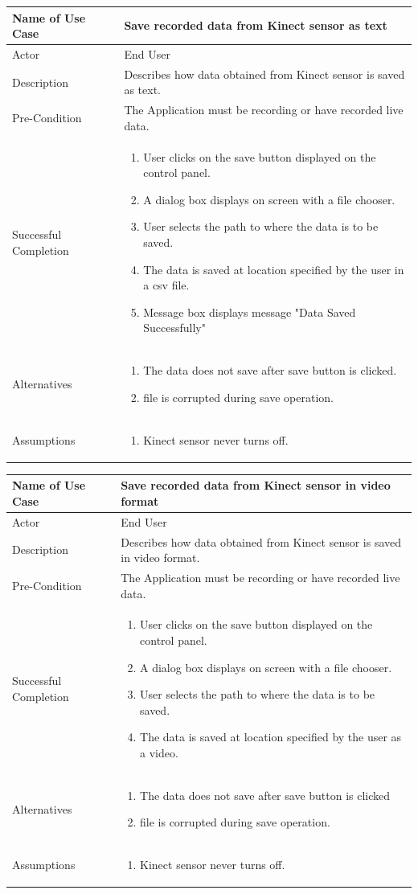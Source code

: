 \documentclass[a4paper, 12pt]{article}
\newcommand\addrow[2]{#1 &#2\\ }
\newcommand\addheading[2]{#1 &#2\\ \hline}
\newcommand\tabularhead{\begin{tabular}{lp{8cm}}
\hline
}
\newcommand\addmulrow[2]{ \begin{minipage}[t][][t]{2.5cm}#1\end{minipage}%
   &\begin{minipage}[t][][t]{8cm}
    \begin{enumerate} #2   \end{enumerate}
    \end{minipage}\\ }
\newenvironment{usecase}{\tabularhead}
{\hline\end{tabular}}
\begin{document}
\begin{usecase}
	\addheading{Name of Use Case}{Save recorded data from Kinect sensor as text }
	\addrow{Actor}{End User}
	\addrow{Description}{Describes how data obtained from Kinect sensor is saved as text.}
	\addrow{Pre-Condition}{The Application must be recording or have recorded live data.}
	\addmulrow{Successful Completion}{
		\item User clicks on the save button displayed on the control panel. 
		\item A dialog box displays on screen with a file chooser. 
		\item User selects the path to where the data is to be saved.
		\item The data is saved at location specified by the user in a csv file.
		\item Message box displays message "Data Saved Successfully"}
	\addmulrow{Alternatives}{ 
	\item The data does not save after save button is clicked.
	\item file is corrupted during save operation.}
	\addmulrow{Assumptions}{
	\item Kinect sensor never turns off. }
\end{usecase}

\begin{usecase}
	\addheading{Name of Use Case}{Save recorded data from Kinect sensor in video format }
	\addrow{Actor}{End User}
	\addrow{Description}{Describes how data obtained from Kinect sensor is saved in video format.}
	\addrow{Pre-Condition}{The Application must be recording or have recorded live data.}
	\addmulrow{Successful Completion}{
		\item User clicks on the save button displayed on the control panel. 
		\item A dialog box displays on screen with a file chooser. 
		\item User selects the path to where the data is to be saved.
		\item The data is saved at location specified by the user as a video.}
	\addmulrow{Alternatives}{ 
	\item The data does not save after save button is clicked 
	\item file is corrupted during save operation.}
	\addmulrow{Assumptions}{
	\item Kinect sensor never turns off. }
\end{usecase}
\end{document}
